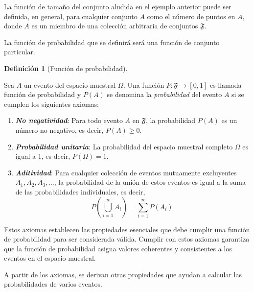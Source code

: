 \documentclass[
  us-letterpaper,
]{scrreprt}
\theoremstyle{plain}
\theoremstyle{definition}
\newtheorem{definition}{Definición}[chapter]
\theoremstyle{definition}
\theoremstyle{plain}
\theoremstyle{remark}
\begin{document}
La función de tamaño del conjunto aludida en el ejemplo anterior puede
ser definida, en general, para cualquier conjunto \(A\) como el número
de puntos en \(A\), donde \(A\) es un miembro de una colección
arbitraria de conjuntos \(\mathfrak{F}\).

La función de probabilidad que se definirá será una función de conjunto
particular.

\begin{definition}[Función de
probabilidad]\protect\hypertarget{def-fprob}{}\label{def-fprob}

Sea \(A\) un evento del espacio muestral \(\Omega\). Una función
\(P: \mathfrak{F} \to [0,1]\) es llamada función de probabilidad y
\(P(A)\) se denomina la \emph{probabilidad} del evento \(A\) si se
cumplen los siguientes axiomas:

\begin{enumerate}
\def\labelenumi{\roman{enumi}.}
\item
  \textbf{\emph{No negatividad}}: Para todo evento \(A\) en
  \(\mathfrak{F}\), la probabilidad \(P(A)\) es un número no negativo,
  es decir, \(P(A) \geq 0\).
\item
  \textbf{\emph{Probabilidad unitaria}}: La probabilidad del espacio
  muestral completo \(\Omega\) es igual a 1, es decir,
  \(P(\Omega) = 1\).
\item
  \textbf{\emph{Aditividad}}: Para cualquier colección de eventos
  mutuamente excluyentes \(A_1, A_2, A_3, \ldots\), la probabilidad de
  la unión de estos eventos es igual a la suma de las probabilidades
  individuales, es decir,
  \[P\left(\bigcup_{i=1}^\infty A_i\right) = \sum_{i=1}^\infty P(A_i).\]
\end{enumerate}

\end{definition}

Estos axiomas establecen las propiedades esenciales que debe cumplir una
función de probabilidad para ser considerada válida. Cumplir con estos
axiomas garantiza que la función de probabilidad asigna valores
coherentes y consistentes a los eventos en el espacio muestral.

A partir de los axiomas, se derivan otras propiedades que ayudan a
calcular las probabilidades de varios eventos.
\end{document}
